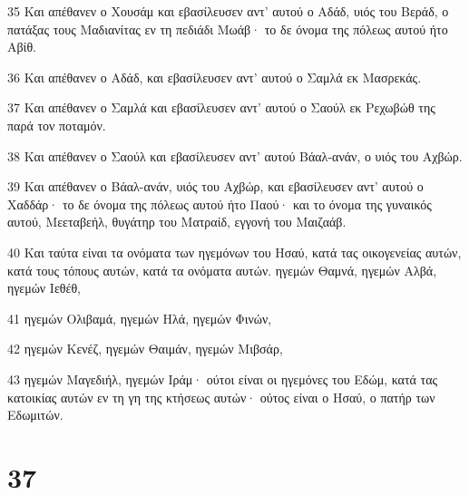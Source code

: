\par 35 Και απέθανεν ο Χουσάμ και εβασίλευσεν αντ' αυτού ο Αδάδ, υιός του Βεράδ, ο πατάξας τους Μαδιανίτας εν τη πεδιάδι Μωάβ· το δε όνομα της πόλεως αυτού ήτο Αβίθ.
\par 36 Και απέθανεν ο Αδάδ, και εβασίλευσεν αντ' αυτού ο Σαμλά εκ Μασρεκάς.
\par 37 Και απέθανεν ο Σαμλά και εβασίλευσεν αντ' αυτού ο Σαούλ εκ Ρεχωβώθ της παρά τον ποταμόν.
\par 38 Και απέθανεν ο Σαούλ και εβασίλευσεν αντ' αυτού Βάαλ-ανάν, ο υιός του Αχβώρ.
\par 39 Και απέθανεν ο Βάαλ-ανάν, υιός του Αχβώρ, και εβασίλευσεν αντ' αυτού ο Χαδδάρ· το δε όνομα της πόλεως αυτού ήτο Παού· και το όνομα της γυναικός αυτού, Μεεταβεήλ, θυγάτηρ του Ματραίδ, εγγονή του Μαιζαάβ.
\par 40 Και ταύτα είναι τα ονόματα των ηγεμόνων του Ησαύ, κατά τας οικογενείας αυτών, κατά τους τόπους αυτών, κατά τα ονόματα αυτών. ηγεμών Θαμνά, ηγεμών Αλβά, ηγεμών Ιεθέθ,
\par 41 ηγεμών Ολιβαμά, ηγεμών Ηλά, ηγεμών Φινών,
\par 42 ηγεμών Κενέζ, ηγεμών Θαιμάν, ηγεμών Μιβσάρ,
\par 43 ηγεμών Μαγεδιήλ, ηγεμών Ιράμ· ούτοι είναι οι ηγεμόνες του Εδώμ, κατά τας κατοικίας αυτών εν τη γη της κτήσεως αυτών· ούτος είναι ο Ησαύ, ο πατήρ των Εδωμιτών.

\chapter{37}

